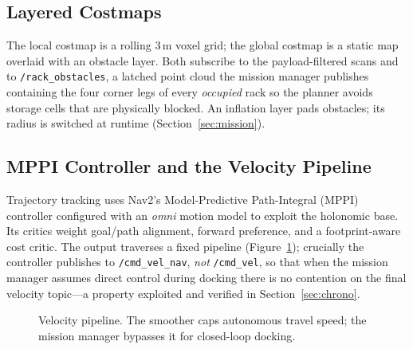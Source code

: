 \documentclass[11pt,a4paper]{article}
\newcommand{\code}[1]{\texttt{\small #1}}
\begin{document}
\subsection{Layered Costmaps}
The local costmap is a rolling 3\,m voxel grid; the global costmap is a static
map overlaid with an obstacle layer. Both subscribe to the payload-filtered
scans and to \code{/rack\_obstacles}, a latched point cloud the mission manager
publishes containing the four corner legs of every \emph{occupied} rack so
the planner avoids storage cells that are physically blocked. An inflation
layer pads obstacles; its radius is switched at runtime
(Section~\ref{sec:mission}).

\subsection{MPPI Controller and the Velocity Pipeline}
Trajectory tracking uses Nav2's Model-Predictive Path-Integral (MPPI)
controller configured with an \emph{omni} motion model to exploit the
holonomic base. Its critics weight goal/path alignment, forward preference,
and a footprint-aware cost critic. The output traverses a fixed pipeline
(Figure~\ref{fig:vel}); crucially the controller publishes to
\code{/cmd\_vel\_nav}, \emph{not} \code{/cmd\_vel}, so that when the mission
manager assumes direct control during docking there is no contention on the
final velocity topic---a property exploited and verified in
Section~\ref{sec:chrono}.

\begin{figure}[h]\centering
{}
\caption{Velocity pipeline. The smoother caps autonomous travel speed; the
mission manager bypasses it for closed-loop docking.}\label{fig:vel}
\end{figure}

\end{document}
